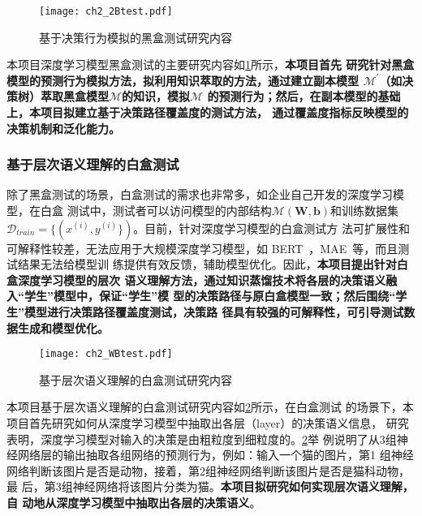 \begin{figure}[htp]
    \begin{small}
        \begin{center}
            \texttt{[image: ch2\_2Btest.pdf]}
        \end{center}
        \caption{基于决策行为模拟的黑盒测试研究内容}
        \label{fig:ch2:2Btest}
    \end{small}
\end{figure}
本项目深度学习模型黑盒测试的主要研究内容如\cref{fig:ch2:2Btest}所示，\textbf{本项目首先
研究针对黑盒模型的预测行为模拟方法，拟利用知识萃取的方法，通过建立副本模型
$\mathcal M^\prime$（如决策树）萃取黑盒模型$\mathcal M$的知识，模拟$\mathcal M$
的预测行为；然后，在副本模型的基础上，本项目拟建立基于决策路径覆盖度的测试方法，
通过覆盖度指标反映模型的决策机制和泛化能力。}

\subsubsection{基于层次语义理解的白盒测试}

除了黑盒测试的场景，白盒测试的需求也非常多，如企业自己开发的深度学习模型，在白盒
测试中，测试者可以访问模型的内部结构$\mathcal M(\bm W, \bm b)$和训练数据集
$\mathcal D_{train}=\{(x^{(i)}, y^{(i)}\})$。目前，针对深度学习模型的白盒测试方
法可扩展性和可解释性较差，无法应用于大规模深度学习模型，如
BERT~\cite{kenton2019bert}，MAE~\cite{he2021masked}等，而且测试结果无法给模型训
练提供有效反馈，辅助模型优化。因此，\textbf{本项目提出针对白盒深度学习模型的层次
语义理解方法，通过知识蒸馏技术将各层的决策语义融入``学生''模型中，保证``学生''模
型的决策路径与原白盒模型一致；然后围绕``学生''模型进行决策路径覆盖度测试，决策路
径具有较强的可解释性，可引导测试数据生成和模型优化。}

\begin{figure}[htp]
    \begin{small}
        \begin{center}
            \texttt{[image: ch2\_WBtest.pdf]}
        \end{center}
        \caption{基于层次语义理解的白盒测试研究内容}
        \label{fig:ch2:WBtest}
    \end{small}
\end{figure}

本项目基于层次语义理解的白盒测试研究内容如\cref{fig:ch2:WBtest}所示，在白盒测试
的场景下，本项目首先研究如何从深度学习模型中抽取出各层（layer）的决策语义信息，
研究表明，深度学习模型对输入的决策是由粗粒度到细粒度的。\cref{fig:ch2:WBtest}举
例说明了从3组神经网络层的输出抽取各组网络的预测行为，例如：输入一个猫的图片，第1
组神经网络判断该图片是否是动物，接着，第2组神经网络判断该图片是否是猫科动物，最
后，第3组神经网络将该图片分类为猫。\textbf{本项目拟研究如何实现层次语义理解，自
动地从深度学习模型中抽取出各层的决策语义}。

